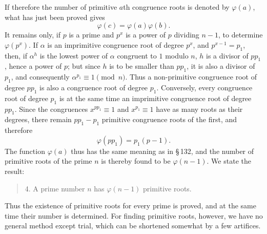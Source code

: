 \documentclass[11pt]{article}
\begin{document}
If therefore the number of primitive $a$th congruence roots is denoted by $\varphi(a)$, what has just been proved gives
\[
\tag{12}       \varphi(c)=\varphi(a)\varphi(b).
\]
It remains only, if $p$ is a prime and $p^x$ is a power of $p$ dividing $n-1$, to determine $\varphi(p^x)$. If $\alpha$ is an imprimitive congruence root of degree $p^x$, and $p^{x-1}=p_1$, then, if $\alpha^h$ is the lowest power of $\alpha$ congruent to $1$ modulo $n$, $h$ is a divisor of $pp_1$, hence a power of $p$; but since $h$ is to be smaller than $pp_1$, it is also a divisor of $p_1$, and consequently $\alpha^{p_1}\equiv1\pmod n$. Thus a non-primitive congruence root of degree $pp_1$ is also a congruence root of degree $p_1$. Conversely, every congruence root of degree $p_1$ is at the same time an imprimitive congruence root of degree $pp_1$. Since the congruences $x^{pp_1}\equiv1$ and $x^{p_1}\equiv1$ have as many roots as their degrees, there remain $pp_1-p_1$ primitive congruence roots of the first, and therefore
\[
\tag{13}       \varphi(pp_1)=p_1(p-1).
\]
The function $\varphi(a)$ thus has the same meaning as in \S\,132, and the number of primitive roots of the prime $n$ is thereby found to be $\varphi(n-1)$. We state the result:
\begin{quote}
4. A prime number $n$ has $\varphi(n-1)$ primitive roots.
\end{quote}
Thus the existence of primitive roots for every prime is proved, and at the same time their number is determined. For finding primitive roots, however, we have no general method except trial, which can be shortened somewhat by a few artifices.
\end{document}
